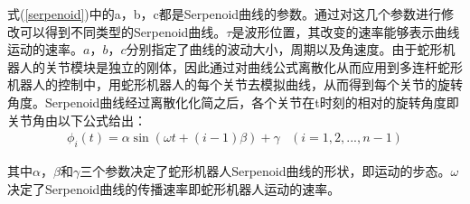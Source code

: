 式(\ref{serpenoid})中的a，b，c都是Serpenoid曲线的参数。通过对这几个参数进行修改可以得到不同类型的Serpenoid曲线。$\tau$是波形位置，其改变的速率能够表示曲线运动的速率。$a$，$b$，$c$分别指定了曲线的波动大小，周期以及角速度。由于蛇形机器人的关节模块是独立的刚体，因此通过对曲线公式离散化从而应用到多连杆蛇形机器人的控制中，用蛇形机器人的每个关节去模拟曲线，从而得到每个关节的旋转角度。Serpenoid曲线经过离散化化简之后，各个关节在t时刻的相对的旋转角度即关节角由以下公式给出：
\begin{eqnarray}\label{angledegree}
\phi _{i}(t)=\alpha \sin(\omega t+(i-1)\beta )+\gamma &(i=1,2,...,n-1)
\end{eqnarray}

其中$\alpha$，$\beta$和$\gamma$三个参数决定了蛇形机器人Serpenoid曲线的形状，即运动的步态。$\omega$决定了Serpenoid曲线的传播速率即蛇形机器人运动的速率。


